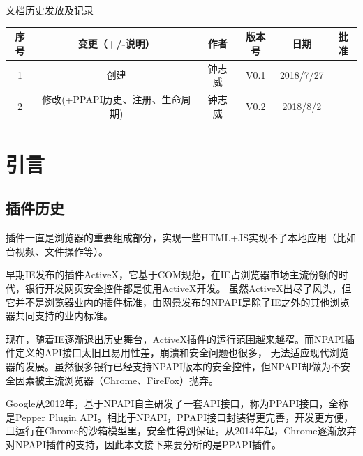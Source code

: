 \begin{table}
\begin{center}
\Large
文档历史发放及记录\vspace{3ex}\\
\scriptsize
\begin{tabular}{|c|c|c|c|c|c|}
\hline
序号 & 变更（+/-说明） & 作者 & 版本号 & 日期 & 批准 \\
\hline  
1 & 创建 & 钟志威 & V0.1 & 2018/7/27 &  \\
\hline
2 & 修改(+PPAPI历史、注册、生命周期) & 钟志威 & V0.2 & 2018/8/2 & \\
\hline
\end{tabular}
\end{center}
\end{table}
\clearpage


\renewcommand{\contentsname}{\hspace*{\fill}目\quad 录\hspace*{\fill}}
\tableofcontents


\vspace{50ex}
\section{引言}
\subsection{插件历史}
插件一直是浏览器的重要组成部分，实现一些HTML+JS实现不了本地应用（比如音视频、文件操作等）。\par
早期IE发布的插件ActiveX，它基于COM规范，在IE占浏览器市场主流份额的时代，银行开发网页安全控件都是使用ActiveX开发。
虽然ActiveX出尽了风头，但它并不是浏览器业内的插件标准，由网景发布的NPAPI是除了IE之外的其他浏览器共同支持的业内标准。\par
现在，随着IE逐渐退出历史舞台，ActiveX插件的运行范围越来越窄。而NPAPI插件定义的API接口太旧且易用性差，崩溃和安全问题也很多，
无法适应现代浏览器的发展。虽然很多银行已经支持NPAPI版本的安全控件，但NPAPI却做为不安全因素被主流浏览器（Chrome、FireFox）抛弃。\par
Google从2012年，基于NPAPI自主研发了一套API接口，称为PPAPI接口，全称是Pepper Plugin API。相比于NPAPI，PPAPI接口封装得更完善，开发更方便，
且运行在Chrome的沙箱模型里，安全性得到保证。从2014年起，Chrome逐渐放弃对NPAPI插件的支持，因此本文接下来要分析的是PPAPI插件。

